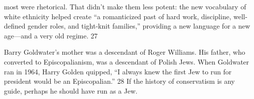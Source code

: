 most were rhetorical. That didn’t make them less potent: the new vocabulary of white ethnicity helped create “a romanticized past of hard work, discipline, well-defined gender roles, and tight-knit families,” providing a new language for a new age—and a very old regime. {\color{blue} 27 } {\par} Barry Goldwater’s mother was a descendant of Roger Williams. His father, who converted to Episcopalianism, was a descendant of Polish Jews. When Goldwater ran in 1964, Harry Golden quipped, “I always knew the first Jew to run for president would be an Episcopalian.” {\color{blue} 28 } If the history of conservatism is any guide, perhaps he should have run as a Jew.{\par}